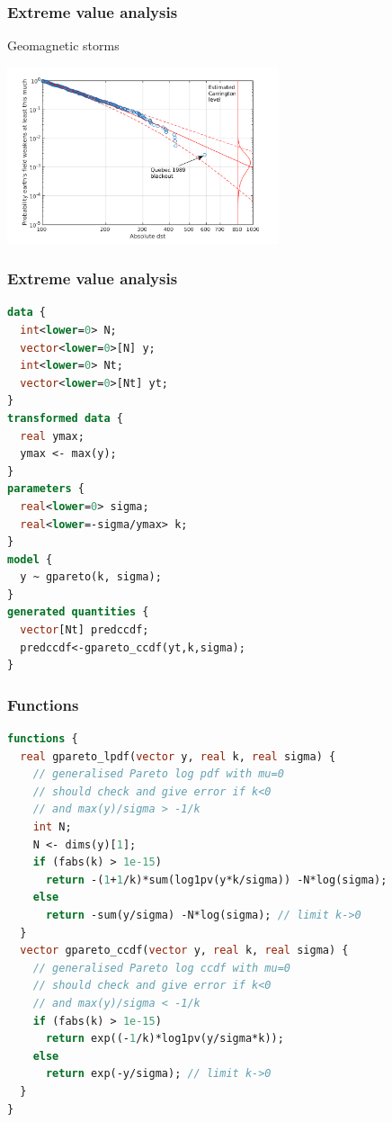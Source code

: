 \documentclass[10pt]{beamer}
\begin{document}
\begin{frame}

\frametitle{Extreme value analysis}

Geomagnetic storms

\includegraphics[width=8cm]{figs/stan_gpareto_geomev.png}

\end{frame}

\begin{frame}[fragile]

\frametitle{Extreme value analysis}
  {\small
  \begin{lstlisting}[language=Stan]
data {
  int<lower=0> N;
  vector<lower=0>[N] y;
  int<lower=0> Nt;
  vector<lower=0>[Nt] yt;
}
transformed data {
  real ymax;
  ymax <- max(y);
}
parameters {
  real<lower=0> sigma;
  real<lower=-sigma/ymax> k;
}
model {
  y ~ gpareto(k, sigma);
}
generated quantities {
  vector[Nt] predccdf;
  predccdf<-gpareto_ccdf(yt,k,sigma);
}
  \end{lstlisting}
}
\end{frame}

\begin{frame}[fragile]

\frametitle{Functions}
  {\footnotesize
  \begin{lstlisting}[language=Stan]
functions {
  real gpareto_lpdf(vector y, real k, real sigma) {
    // generalised Pareto log pdf with mu=0
    // should check and give error if k<0
    // and max(y)/sigma > -1/k
    int N;
    N <- dims(y)[1];
    if (fabs(k) > 1e-15)
      return -(1+1/k)*sum(log1pv(y*k/sigma)) -N*log(sigma);
    else
      return -sum(y/sigma) -N*log(sigma); // limit k->0
  }
  vector gpareto_ccdf(vector y, real k, real sigma) {
    // generalised Pareto log ccdf with mu=0
    // should check and give error if k<0
    // and max(y)/sigma < -1/k
    if (fabs(k) > 1e-15)
      return exp((-1/k)*log1pv(y/sigma*k));
    else
      return exp(-y/sigma); // limit k->0
  }
}
  \end{lstlisting}
}
\end{frame}
\end{document}
